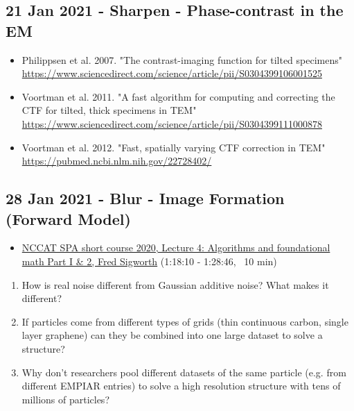 \documentclass[11pt, oneside]{article}   	%
\begin{document}
\subsection{21 Jan 2021 - Sharpen - Phase-contrast in the EM}
\begin{itemize}
	\item  Philippsen et al. 2007. "The contrast-imaging function for tilted specimens" \url{https://www.sciencedirect.com/science/article/pii/S0304399106001525}
	\item Voortman et al. 2011. "A fast algorithm for computing and correcting the CTF for tilted, thick specimens in TEM" \url{https://www.sciencedirect.com/science/article/pii/S0304399111000878}
	\item Voortman et al. 2012. "Fast, spatially varying CTF correction in TEM" \url{https://pubmed.ncbi.nlm.nih.gov/22728402/}	
\end{itemize}

\subsection{28 Jan 2021 - Blur - Image Formation (Forward Model)}
\begin{itemize}
	\item \href{https://youtu.be/tzv5c5K7MEk?t=4690}{NCCAT SPA short course 2020, Lecture 4: Algorithms and foundational math Part I \& 2, Fred Sigworth} (1:18:10 - 1:28:46, ~10 min)
	\end{itemize}
\begin{enumerate}
	\item How is real noise different from Gaussian additive noise? What makes it different? 
	\item  If particles come from different types of grids (thin continuous carbon, single layer graphene) can they be combined into one large dataset to solve a structure?
	\item Why don't researchers pool different datasets of the same particle (e.g. from different EMPIAR entries) to solve a high resolution structure with tens of millions of particles?
\end{enumerate}
\end{document}
